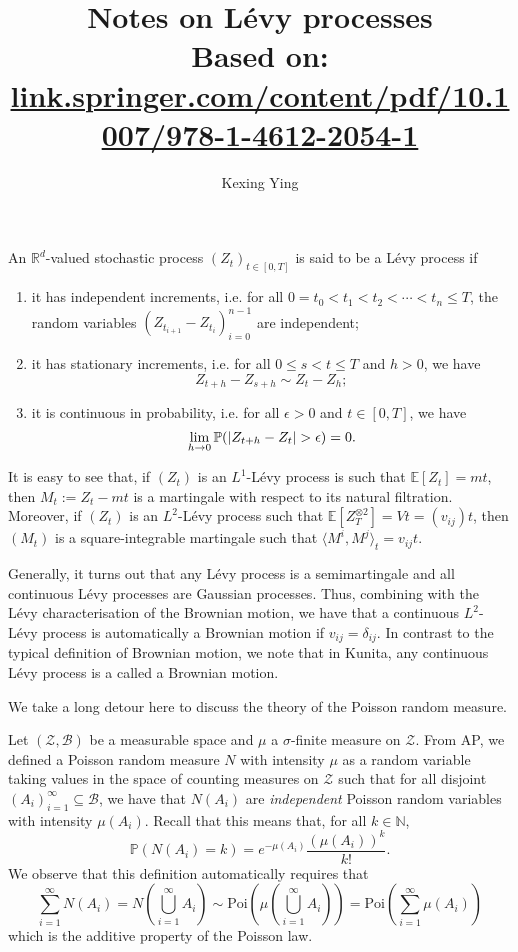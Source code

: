 \documentclass[]{article}
\title{Notes on L\'evy processes\\
  \large Based on: \href{link.springer.com/content/pdf/10.1007/978-1-4612-2054-1}{link.springer.com/content/pdf/10.1007/978-1-4612-2054-1}}
\author{Kexing Ying}
\theoremstyle{definition}
\theoremstyle{definition}
\begin{document}
\maketitle

An \(\mathbb{R}^d\)-valued stochastic process \((Z_t)_{t \in [0, T]}\) is said to be a L\'evy process 
if 
\begin{enumerate}
  \item it has independent increments, i.e. for all \(0 = t_0 < t_1 < t_2 < \cdots < t_n \leq T\), the 
    random variables \((Z_{t_{i + 1}} - Z_{t_i})_{i = 0}^{n - 1}\) are independent;
  \item it has stationary increments, i.e. for all \(0 \leq s < t \leq T\) and \(h > 0\), we have 
    \[Z_{t + h} - Z_{s + h} \sim Z_t - Z_h;\]
  \item it is continuous in probability, i.e. for all \(\epsilon > 0\) and \(t \in [0, T]\), we have 
    \[\lim_{h \to 0} \mathbb{P}(\abs{Z_{t + h} - Z_t} > \epsilon) = 0.\]
\end{enumerate}

It is easy to see that, if \((Z_t)\) is an \(L^1\)-L\'evy process is such that \(\mathbb{E}[Z_t] = mt\), 
then \(M_t := Z_t - mt\) is a martingale with respect to its natural filtration. Moreover, if \((Z_t)\) is  
an \(L^2\)-L\'evy process such that \(\mathbb{E}[Z_T^{\otimes 2}] = Vt = (v_{ij}) t\), then \((M_t)\) is a 
square-integrable martingale such that \(\langle M^i, M^j\rangle_t = v_{ij}t\). 

Generally, it turns out that any L\'evy process is a semimartingale and all continuous L\'evy processes 
are Gaussian processes. Thus, combining with the L\'evy characterisation of the Brownian motion, we have 
that a continuous \(L^2\)-L\'evy process is automatically a Brownian motion if \(v_{ij} = \delta_{ij}\).
In contrast to the typical definition of Brownian motion, we note that in Kunita, any continuous 
L\'evy process is a called a Brownian motion.

We take a long detour here to discuss the theory of the Poisson random measure.

Let \((\mathcal{Z}, \mathcal{B})\) be a measurable space and \(\mu\) a \(\sigma\)-finite measure on \(\mathcal{Z}\).
From AP, we defined a Poisson random measure \(N\) with intensity \(\mu\) as a random variable taking values in the space of 
counting measures on \(\mathcal{Z}\) such that for all disjoint \((A_i)_{i = 1}^\infty \subseteq \mathcal{B}\), 
we have that \(N(A_i)\) are \textit{independent} Poisson random variables with intensity \(\mu(A_i)\). 
Recall that this means that, for all \(k \in \mathbb{N}\),
\[\mathbb{P}(N(A_i) = k) = e^{-\mu(A_i)} \frac{(\mu(A_i))^k}{k!}.\]
We observe that this definition automatically requires that
\[\sum_{i = 1}^\infty N(A_i) = N\left(\bigcup_{i = 1}^\infty A_i\right) \sim 
  \text{Poi}\left(\mu\left(\bigcup_{i = 1}^\infty A_i\right)\right) = 
  \text{Poi}\left(\sum_{i = 1}^\infty \mu(A_i)\right)\]
which is the additive property of the Poisson law.
\end{document}
